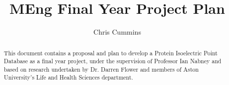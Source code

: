 \title{MEng Final Year Project Plan}
\author{Chris Cummins}


\maketitle

\begin{abstract}
\noindent
This document contains a proposal and plan to develop a Protein Isoelectric
Point Database as a final year project, under the supervision of Professor Ian
Nabney and based on research undertaken by Dr. Darren Flower and members of
Aston University's Life and Health Sciences department.
\end{abstract}
